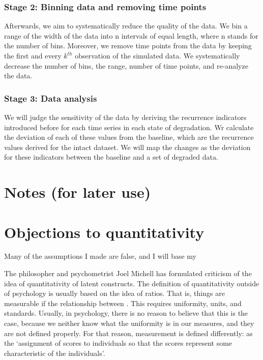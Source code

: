 \documentclass[utf8]{FrontiersinVancouver}
\begin{document}
\subsubsection{Stage 2: Binning data and removing time points}

Afterwards, we aim to systematically reduce the quality of the data. We bin a range of the width of the data into n intervals of equal length, where n stands for the number of bins. Moreover, we remove time points from the data by keeping the first and every $k^{th}$ observation of the simulated data. We systematically decrease the number of bins, the range, number of time points, and re-analyze the data.

\subsubsection{Stage 3: Data analysis}
We will judge the sensitivity of the data by deriving the recurrence indicators introduced before for each time series in each state of degradation. Wr calculate the deviation of each of these values from the baseline, which are the recurrence values derived for the intact dataset. We will map the changes as the deviation for these indicators between the baseline and a set of degraded data.




\section{Notes (for later use)}
\section{Objections to quantitativity}
Many of the assumptions I made are false, and I will base my 

The philosopher and psychometrist Joel Michell has formulated criticism of the idea of quantitativity of latent constructs. The definition of quantitativity outside of psychology is usually based on the idea of ratios. That is, things are measurable if the relationship between . This requires uniformity, units, and standards. Usually, in psychology, there is no reason to believe that this is the case, because we neither know what the uniformity is in our measures, and they are not defined properly. For that reason, measurement is defined differently: as the `assignment of scores to individuals so that the scores represent some characteristic of the individuals'. 
\end{document}

